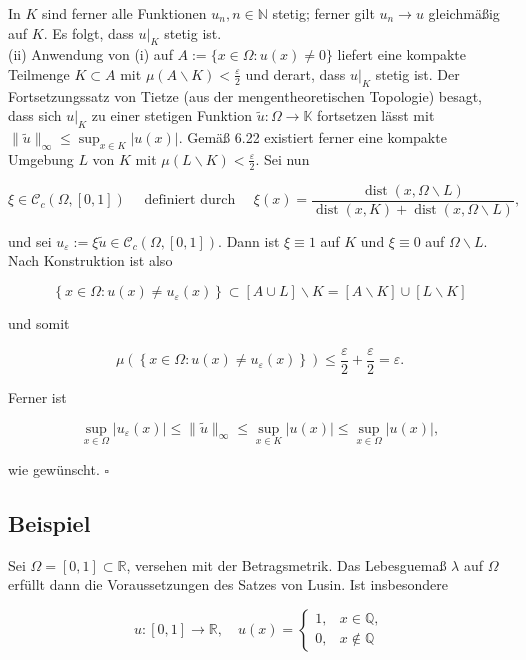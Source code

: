 \documentclass[10pt, letterpaper]{article}
\begin{document}
In $K$ sind ferner alle Funktionen $u_{n}, n \in \mathbb{N}$ stetig; ferner gilt $u_{n} \rightarrow u$ gleichmäßig auf $K$. Es folgt, dass $\left.u\right|_{K}$ stetig ist.\\
(ii) Anwendung von (i) auf $A:=\{x \in \Omega: u(x) \neq 0\}$ liefert eine kompakte Teilmenge $K \subset A$ mit $\mu(A \backslash K)<\frac{\varepsilon}{2}$ und derart, dass $\left.u\right|_{K}$ stetig ist. Der Fortsetzungssatz von Tietze (aus der mengentheoretischen Topologie) besagt, dass sich $\left.u\right|_{K}$ zu einer stetigen Funktion $\tilde{u}: \Omega \rightarrow \mathbb{K}$ fortsetzen lässt mit $\|\tilde{u}\|_{\infty} \leq \sup _{x \in K}|u(x)|$. Gemäß 6.22 existiert ferner eine kompakte Umgebung $L$ von $K$ mit $\mu(L \backslash K)<\frac{\varepsilon}{2}$. Sei nun

$$
\xi \in \mathcal{C}_{c}(\Omega,[0,1]) \quad \text { definiert durch } \quad \xi(x)=\frac{\operatorname{dist}(x, \Omega \backslash L)}{\operatorname{dist}(x, K)+\operatorname{dist}(x, \Omega \backslash L)},
$$

und sei $u_{\varepsilon}:=\xi \tilde{u} \in \mathcal{C}_{c}(\Omega,[0,1])$. Dann ist $\xi \equiv 1$ auf $K$ und $\xi \equiv 0$ auf $\Omega \backslash L$. Nach Konstruktion ist also

$$
\left\{x \in \Omega: u(x) \neq u_{\varepsilon}(x)\right\} \subset[A \cup L] \backslash K=[A \backslash K] \cup[L \backslash K]
$$

und somit

$$
\mu\left(\left\{x \in \Omega: u(x) \neq u_{\varepsilon}(x)\right\}\right) \leq \frac{\varepsilon}{2}+\frac{\varepsilon}{2}=\varepsilon .
$$

Ferner ist

$$
\sup _{x \in \Omega}\left|u_{\varepsilon}(x)\right| \leq\|\tilde{u}\|_{\infty} \leq \sup _{x \in K}|u(x)| \leq \sup _{x \in \Omega}|u(x)|,
$$

wie gewünscht. \(\square\)

\subsection*{Beispiel}
Sei $\Omega=[0,1] \subset \mathbb{R}$, versehen mit der Betragsmetrik. Das Lebesguemaß $\lambda$ auf $\Omega$ erfüllt dann die Voraussetzungen des Satzes von Lusin. Ist insbesondere

$$
u:[0,1] \rightarrow \mathbb{R}, \quad u(x)= \begin{cases}1, & x \in \mathbb{Q}, \\ 0, & x \notin \mathbb{Q}\end{cases}
$$
\end{document}
